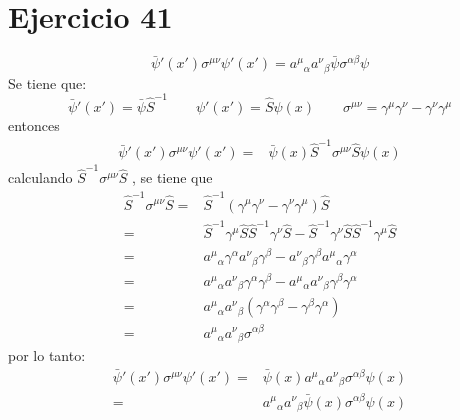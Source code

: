 \section*{Ejercicio 41}
\begin{equation*}
    {\bar{\psi}}' ({x}') \sigma^{\mu\nu} {\psi}'({x}')= {a^\mu}_\alpha {a^\nu}_\beta \bar{\psi} \sigma^{\alpha\beta} \psi
\end{equation*}
Se tiene que:
\begin{equation*}
    {\bar{\psi}}'({x}') = \bar{\psi} \hat{S}^{-1} \qquad {\psi}'({x}')=\hat{S}\psi(x) 
    \qquad \sigma^{\mu \nu} = \gamma^\mu \gamma^\nu -\gamma^\nu \gamma^\mu 
\end{equation*}
entonces 
\begin{align*}
    {\bar{\psi}}' ({x}') \sigma^{\mu\nu} {\psi}'({x}')=& \bar{\psi}(x)\hat{S}^{-1} \sigma^{\mu\nu} \hat{S} \psi(x)
\end{align*}
calculando $\hat{S}^{-1} \sigma^{\mu\nu} \hat{S}$ , se tiene que
\begin{align*}
    \hat{S}^{-1} \sigma^{\mu\nu} \hat{S} =& \hat{S}^{-1} \left( \gamma^\mu \gamma^\nu -\gamma^\nu \gamma^\mu \right) \hat{S}\\
    =& \hat{S}^{-1} \gamma^\mu \hat{S}\hat{S}^{-1}\gamma^\nu \hat{S}- \hat{S}^{-1}\gamma^\nu \hat{S}\hat{S}^{-1}\gamma^\mu \hat{S}\\
    =& {a^\mu}_\alpha \gamma^\alpha {a^\nu}_\beta \gamma^\beta - {a^\nu}_\beta \gamma^\beta {a^\mu}_\alpha \gamma^\alpha \\
    =& {a^\mu}_\alpha {a^\nu}_\beta \gamma^\alpha \gamma^\beta - {a^\mu}_\alpha {a^\nu}_\beta \gamma^\beta \gamma^\alpha\\
    =& {a^\mu}_\alpha {a^\nu}_\beta  \left(\gamma^\alpha \gamma^\beta-\gamma^\beta \gamma^\alpha \right)\\
    =& {a^\mu}_\alpha {a^\nu}_\beta \sigma^{\alpha \beta}
\end{align*}
por lo tanto:
\begin{align*}
    {\bar{\psi}}' ({x}') \sigma^{\mu\nu} {\psi}'({x}') =& \bar{\psi}(x) {a^\mu}_\alpha {a^\nu}_\beta \sigma^{\alpha \beta} \psi(x)\\
    =&  {a^\mu}_\alpha {a^\nu}_\beta \bar{\psi}(x) \sigma^{\alpha \beta} \psi(x)
\end{align*}